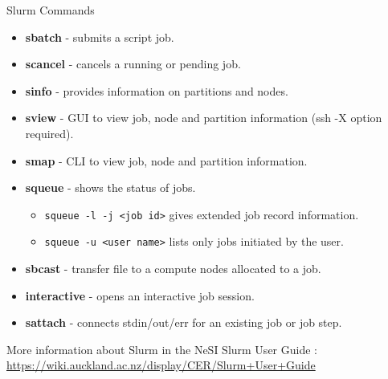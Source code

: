 \documentclass[final,t]{beamer}
\begin{document}
 \begin{frame}[fragile]{} 
  \begin{columns}[t]
    \begin{column}{.35\linewidth}


      \begin{block}{Slurm Commands}
        \begin{itemize}
        \item  \textbf{sbatch} - submits a script job.
        \item \textbf{scancel} - cancels a running or pending job.
	    \item \textbf{sinfo} - provides information on partitions and nodes.
	    \item \textbf{sview} - GUI to view job, node and partition information (ssh -X option required).
	    \item \textbf{smap} - CLI to view job, node and partition information.
        \item  \textbf{squeue} - shows the status of jobs. 
         \begin{itemize}
              \item \verb|squeue -l -j <job id>| gives extended job record information.
              \item \verb|squeue -u <user name>| lists only jobs initiated by the user.
        \end{itemize}
        \item \textbf{sbcast} - transfer file to a compute nodes allocated to a job.
        \item \textbf{interactive} - opens an interactive job session.
	    \item \textbf{sattach} - connects stdin/out/err for an existing job or job step.
        \end{itemize}
       More information about Slurm in the NeSI Slurm User Guide : \url{https://wiki.auckland.ac.nz/display/CER/Slurm+User+Guide}
      \end{block}


\end{column}
\end{columns}
\end{frame}
\end{document}
